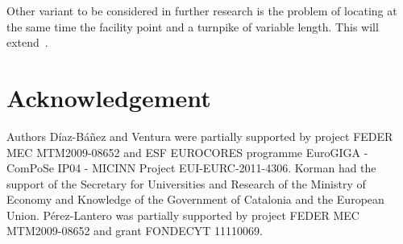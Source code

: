 \documentclass[11pt,a4paper,oneside,onecolumn]{article}
\begin{document}
Other variant to be considered in further research is the problem of locating at the
same time the facility point and a turnpike of variable length. This will
extend~\cite{diaz-banez11,espejo11}.


\section*{Acknowledgement}

Authors D\'iaz-B\'a\~nez and Ventura were partially supported by 
project FEDER MEC MTM2009-08652 and ESF EUROCORES programme 
EuroGIGA - ComPoSe IP04 - MICINN 
Project EUI-EURC-2011-4306. 
Korman had the support of the Secretary for 
Universities and Research of the Ministry of Economy and Knowledge of the 
Government of Catalonia and the European Union.
P\'erez-Lantero was partially supported by project FEDER MEC MTM2009-08652 and
grant FONDECYT 11110069.

\nocite{*}

\small



\end{document}

